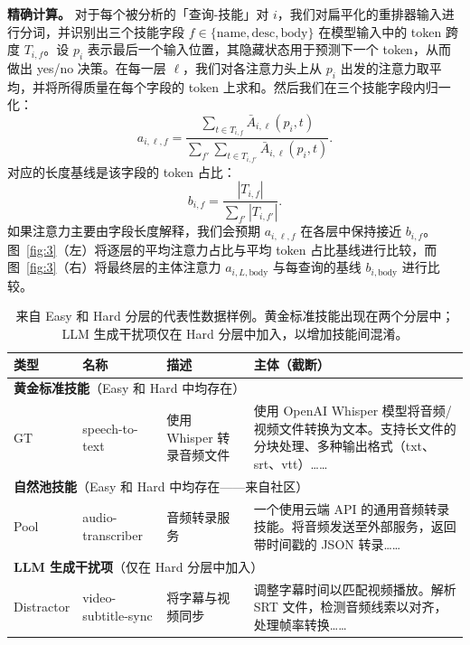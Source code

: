 \documentclass[11pt,UTF8,fontset=fandol]{ctexart}
\begin{document}
\textbf{精确计算。} 对于每个被分析的「查询-技能」对 $i$，我们对扁平化的重排器输入进行分词，并识别出三个技能字段 $f \in \{\text{name}, \text{desc}, \text{body}\}$ 在模型输入中的 token 跨度 $T_{i,f}$。设 $p_i$ 表示最后一个输入位置，其隐藏状态用于预测下一个 token，从而做出 yes/no 决策。在每一层 $\ell$，我们对各注意力头上从 $p_i$ 出发的注意力取平均，并将所得质量在每个字段的 token 上求和。然后我们在三个技能字段内归一化：
\[
a_{i,\ell,f} = \frac{\sum_{t \in T_{i,f}} \bar{A}_{i,\ell}(p_i, t)}{\sum_{f'} \sum_{t \in T_{i,f'}} \bar{A}_{i,\ell}(p_i, t)}.
\]
对应的长度基线是该字段的 token 占比：
\[
b_{i,f} = \frac{|T_{i,f}|}{\sum_{f'} |T_{i,f'}|}.
\]
如果注意力主要由字段长度解释，我们会预期 $a_{i,\ell,f}$ 在各层中保持接近 $b_{i,f}$。图~\ref{fig:3}（左）将逐层的平均注意力占比与平均 token 占比基线进行比较，而图~\ref{fig:3}（右）将最终层的主体注意力 $a_{i,L,\text{body}}$ 与每查询的基线 $b_{i,\text{body}}$ 进行比较。

\begin{table}[H]\centering
\caption{来自 Easy 和 Hard 分层的代表性数据样例。黄金标准技能出现在两个分层中；LLM 生成干扰项仅在 Hard 分层中加入，以增加技能间混淆。}
\small
\begin{tabular}{p{1.4cm} p{2.6cm} p{3.0cm} p{5.6cm}}
\toprule
类型 & 名称 & 描述 & 主体（截断） \\ \midrule
\multicolumn{4}{l}{\textbf{黄金标准技能}（Easy 和 Hard 中均存在）} \\
GT & speech-to-text & 使用 Whisper 转录音频文件 & 使用 OpenAI Whisper 模型将音频/视频文件转换为文本。支持长文件的分块处理、多种输出格式（txt、srt、vtt）…… \\[0.3em]
\multicolumn{4}{l}{\textbf{自然池技能}（Easy 和 Hard 中均存在——来自社区）} \\
Pool & audio-transcriber & 音频转录服务 & 一个使用云端 API 的通用音频转录技能。将音频发送至外部服务，返回带时间戳的 JSON 转录…… \\[0.3em]
\multicolumn{4}{l}{\textbf{LLM 生成干扰项}（仅在 Hard 分层中加入）} \\
Distractor & video-subtitle-sync & 将字幕与视频同步 & 调整字幕时间以匹配视频播放。解析 SRT 文件，检测音频线索以对齐，处理帧率转换…… \\
\bottomrule
\end{tabular}
\label{tab:11}
\end{table}
\end{document}
